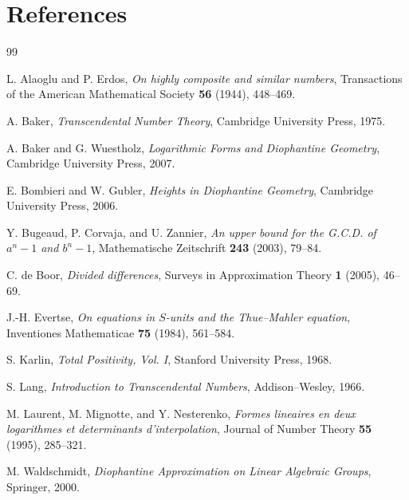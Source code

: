 \documentclass[11pt]{article}
\theoremstyle{definition}
\theoremstyle{remark}
\begin{document}
\section{References}
\begin{thebibliography}{99}

L. Alaoglu and P. Erdos,
\emph{On highly composite and similar numbers},
Transactions of the American Mathematical Society \textbf{56} (1944), 448--469.

A. Baker,
\emph{Transcendental Number Theory},
Cambridge University Press, 1975.

A. Baker and G. Wuestholz,
\emph{Logarithmic Forms and Diophantine Geometry},
Cambridge University Press, 2007.

E. Bombieri and W. Gubler,
\emph{Heights in Diophantine Geometry},
Cambridge University Press, 2006.

Y. Bugeaud, P. Corvaja, and U. Zannier,
\emph{An upper bound for the G.C.D. of $a^n-1$ and $b^n-1$},
Mathematische Zeitschrift \textbf{243} (2003), 79--84.

C. de Boor,
\emph{Divided differences},
Surveys in Approximation Theory \textbf{1} (2005), 46--69.

J.-H. Evertse,
\emph{On equations in $S$-units and the Thue--Mahler equation},
Inventiones Mathematicae \textbf{75} (1984), 561--584.

S. Karlin,
\emph{Total Positivity, Vol. I},
Stanford University Press, 1968.

S. Lang,
\emph{Introduction to Transcendental Numbers},
Addison--Wesley, 1966.

M. Laurent, M. Mignotte, and Y. Nesterenko,
\emph{Formes lineaires en deux logarithmes et determinants d'interpolation},
Journal of Number Theory \textbf{55} (1995), 285--321.

M. Waldschmidt,
\emph{Diophantine Approximation on Linear Algebraic Groups},
Springer, 2000.

\end{thebibliography}
\end{document}
